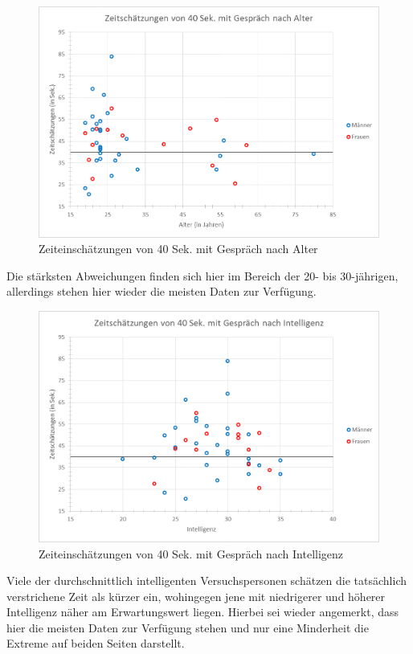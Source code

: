 \documentclass{Paper}
\begin{document}
\begin{figure}[H]
	\centering
	\includegraphics[scale=0.7]{../Diagramme/scatterPre/40mit_alter.png}
	\caption{Zeiteinschätzungen von 40 Sek. mit Gespräch nach Alter}
	\label{img:alter40mit}
\end{figure}

Die stärksten Abweichungen finden sich hier im Bereich der 20- bis 30-jährigen, allerdings stehen hier wieder die meisten Daten zur Verfügung. 


\begin{figure}[H]
	\centering
	\includegraphics[scale=0.7]{../Diagramme/scatterPre/40mit_intelligenz.png}
	\caption{Zeiteinschätzungen von 40 Sek. mit Gespräch nach Intelligenz}
	\label{img:intell40mit}
\end{figure}

Viele der durchschnittlich intelligenten Versuchspersonen schätzen die tatsächlich verstrichene Zeit als kürzer ein, wohingegen jene mit niedrigerer und höherer Intelligenz näher am Erwartungswert liegen. Hierbei sei wieder angemerkt, dass hier die meisten Daten zur Verfügung stehen und nur eine Minderheit die Extreme auf beiden Seiten darstellt.
\end{document}
